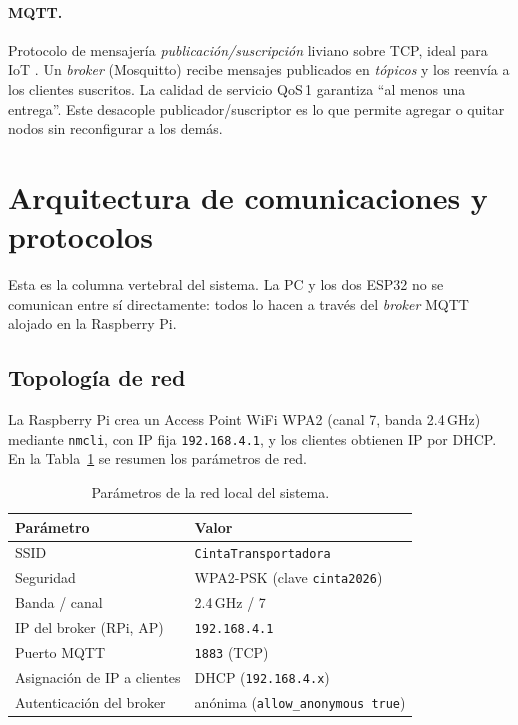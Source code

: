 \documentclass[12pt]{catolica_proyectos}
\begin{document}
\paragraph{MQTT.} Protocolo de mensajería \emph{publicación/suscripción} liviano sobre TCP, ideal para IoT \cite{banks2014mqtt}. Un \emph{broker} (Mosquitto) recibe mensajes publicados en \emph{tópicos} y los reenvía a los clientes suscritos. La calidad de servicio QoS\,1 garantiza ``al menos una entrega''. Este desacople publicador/suscriptor es lo que permite agregar o quitar nodos sin reconfigurar a los demás.

\section{Arquitectura de comunicaciones y protocolos}
\label{sec:comms}

Esta es la columna vertebral del sistema. La PC y los dos ESP32 no se comunican entre sí directamente: todos lo hacen a través del \emph{broker} MQTT alojado en la Raspberry Pi.

\subsection{Topología de red}
La Raspberry Pi crea un Access Point WiFi WPA2 (canal 7, banda 2.4\,GHz) mediante \texttt{nmcli}, con IP fija \texttt{192.168.4.1}, y los clientes obtienen IP por DHCP. En la Tabla~\ref{tab:red} se resumen los parámetros de red.

\begin{table}[H]
\centering
\caption{Parámetros de la red local del sistema.}
\label{tab:red}
\footnotesize
\begin{tabular}{@{}ll@{}}
\toprule
\textbf{Parámetro} & \textbf{Valor} \\
\midrule
SSID & \texttt{CintaTransportadora} \\
Seguridad & WPA2-PSK (clave \texttt{cinta2026}) \\
Banda / canal & 2.4\,GHz / 7 \\
IP del broker (RPi, AP) & \texttt{192.168.4.1} \\
Puerto MQTT & \texttt{1883} (TCP) \\
Asignación de IP a clientes & DHCP (\texttt{192.168.4.x}) \\
Autenticación del broker & anónima (\texttt{allow\_anonymous true}) \\
\bottomrule
\end{tabular}
\end{table}
\end{document}
